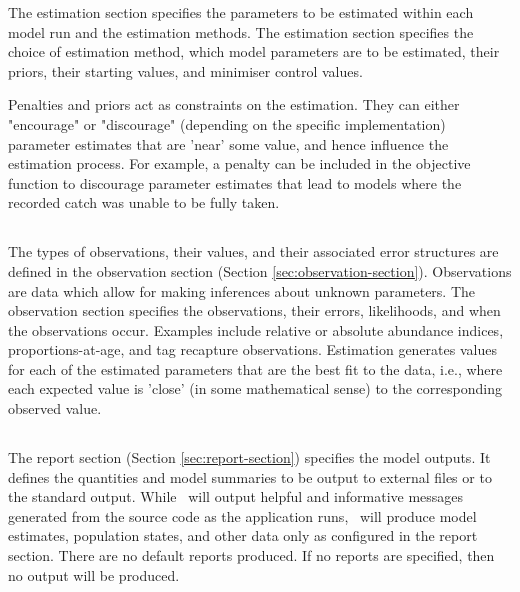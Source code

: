 The estimation section specifies the parameters to be estimated within each model run and the estimation methods. The estimation section specifies the choice of estimation method, which model parameters are to be estimated, their priors, their starting values, and minimiser control values.

Penalties and priors act as constraints on the estimation. They can either "encourage" or "discourage" (depending on the specific implementation) parameter estimates that are 'near' some value, and hence influence the estimation process. For example, a penalty can be included in the objective function to discourage parameter estimates that lead to models where the recorded catch was unable to be fully taken.

\subsection{}

The types of observations, their values, and their associated error structures are defined in the observation section (Section \ref{sec:observation-section}). Observations are data which allow for making inferences about unknown parameters. The observation section specifies the observations, their errors, likelihoods, and when the observations occur. Examples include relative or absolute abundance indices, proportions-at-age, and tag recapture observations. Estimation generates values for each of the estimated parameters that are the best fit to the data, i.e., where each expected value is 'close' (in some mathematical sense) to the corresponding observed value. 

\subsection{}

The report section (Section \ref{sec:report-section}) specifies the model outputs. It defines the quantities and model summaries to be output to external files or to the standard output. While \CNAME\ will output helpful and informative messages generated from the source code as the application runs, \CNAME\ will produce model estimates, population states, and other data only as configured in the report section. There are no default reports produced.  If no reports are specified, then no output will be produced.
